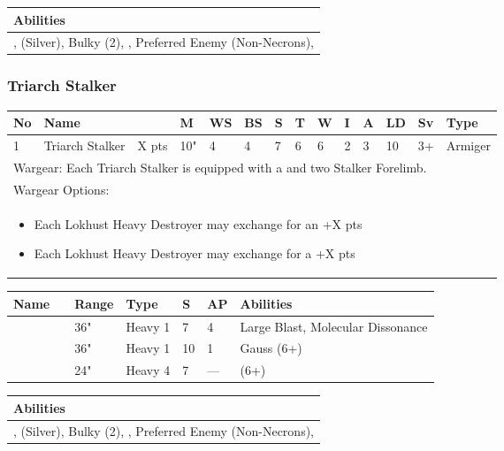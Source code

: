 \noindent
\begin{tabular}{||m{532pt}||}
	\hline
	Abilities \\
	\hline
	\quickref{Annihilation Protocols}, \quickref{Awakening Protocols} (Silver), Bulky (2), \quickref{Living Metal}, Preferred Enemy (Non-Necrons), \quickref{Reanimation Protocols} \\
	\hline
\end{tabular}


\newpage
\subsubsection{Triarch Stalker}

\noindent
\begin{tabular}{||m{10pt} m{95pt} m{30pt} m{11pt} m{11pt} m{11pt} m{11pt} m{11pt} m{11pt} m{11pt} m{11pt} m{11pt} m{11pt} m{125pt}||}
	\hline
	No & Name & & M & WS & BS & S & T & W & I & A & LD & Sv & Type \\
	\hline
	1 & Triarch Stalker & X pts & 10" & 4 & 4 & 7 & 6 & 6 & 2 & 3 & 10 & 3+ & Armiger \\
	\hline
	\hline
	\multicolumn{14}{||Z{532 pt}||}{Wargear: Each Triarch Stalker is equipped with a \quickref{Heat Ray} and two Stalker Forelimb.} \\
	\multicolumn{14}{||Z{532 pt}||}{Wargear Options:} \\	\multicolumn{14}{||Z{532 pt}||}{\begin{itemize}
			\item Each Lokhust Heavy Destroyer may exchange \quickref{Gauss Destructor} for an \quickref{Enmitic Exterminator} \hrulefill +X pts
			\item Each Lokhust Heavy Destroyer may exchange \quickref{Gauss Destructor} for a \quickref{Tesla Destructor} \hrulefill +X pts
	\end{itemize}} \\
	\hline
\end{tabular}

\noindent
\begin{tabular}{||m{110pt} m{30pt} m{31pt} m{55pt} m{12pt} m{12pt} m{210pt}||}
	\hline
	Name & & Range & Type & S & AP & Abilities \\
	\hline
	\quickref{Enmitic Exterminator} &  & 36" & Heavy 1 & 7 & 4 & Large Blast, Molecular Dissonance \\
	\quickref{Gauss Destructor} &  & 36" & Heavy 1 & 10 & 1 &  Gauss (6+) \\
	\quickref{Tesla Destructor} &  & 24" & Heavy 4 & 7 & — &  \quickref{Tesla} (6+) \\
	\hline
\end{tabular}

\noindent
\begin{tabular}{||m{532pt}||}
	\hline
	Abilities \\
	\hline
	\quickref{Annihilation Protocols}, \quickref{Awakening Protocols} (Silver), Bulky (2), \quickref{Living Metal}, Preferred Enemy (Non-Necrons), \quickref{Reanimation Protocols} \\
	\hline
\end{tabular}
